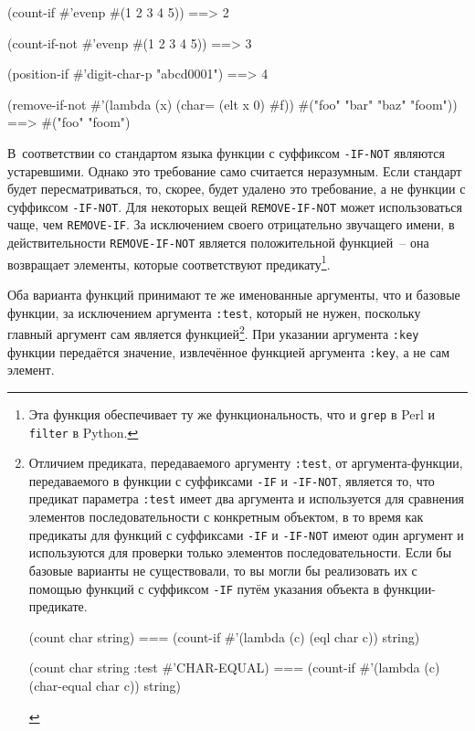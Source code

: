 \begin{myverb}
(count-if #'evenp #(1 2 3 4 5))         ==> 2

(count-if-not #'evenp #(1 2 3 4 5))     ==> 3

(position-if #'digit-char-p "abcd0001") ==> 4

(remove-if-not #'(lambda (x) (char= (elt x 0) #\bslash{}f))
  #("foo" "bar" "baz" "foom")) ==> #("foo" "foom")
\end{myverb}

В~соответствии со стандартом языка функции с суффиксом \lstinline{-IF-NOT} являются
устаревшими.  Однако это требование само считается неразумным.  Если стандарт будет
пересматриваться, то, скорее, будет удалено это требование, а не функции с суффиксом
\lstinline{-IF-NOT}.  Для некоторых вещей \lstinline{REMOVE-IF-NOT} может использоваться чаще, чем
\lstinline{REMOVE-IF}.  За исключением своего отрицательно звучащего имени, в действительности
\lstinline{REMOVE-IF-NOT} является положительной функцией~-- она возвращает элементы, которые
соответствуют предикату\footnote{Эта функция обеспечивает ту же функциональность, что и
  \lstinline{grep} в Perl и \lstinline{filter} в Python.}.

Оба варианта функций принимают те же именованные аргументы, что и базовые функции, за
исключением аргумента \lstinline{:test}, который не нужен, поскольку главный аргумент сам
является функцией\footnote{Отличием предиката, передаваемого аргументу \lstinline{:test}, от
  аргумента-функции, передаваемого в функции с суффиксами \lstinline{-IF} и \lstinline{-IF-NOT},
  является то, что предикат параметра \lstinline{:test} имеет два аргумента и используется для
  сравнения элементов последовательности с конкретным объектом, в то время как предикаты
  для функций с суффиксами \lstinline{-IF} и \lstinline{-IF-NOT} имеют один аргумент и используются
  для проверки только элементов последовательности.  Если бы базовые варианты не
  существовали, то вы могли бы реализовать их с помощью функций с суффиксом \lstinline{-IF}
  путём указания объекта в функции-предикате.

\begin{myverb}
(count char string) ===
  (count-if #'(lambda (c) (eql char c)) string)

(count char string :test #'CHAR-EQUAL) ===
  (count-if #'(lambda (c) (char-equal char c)) string)
\end{myverb}

}.  При указании аргумента \lstinline{:key} функции передаётся значение, извлечённое функцией
аргумента \lstinline{:key}, а не сам элемент.


